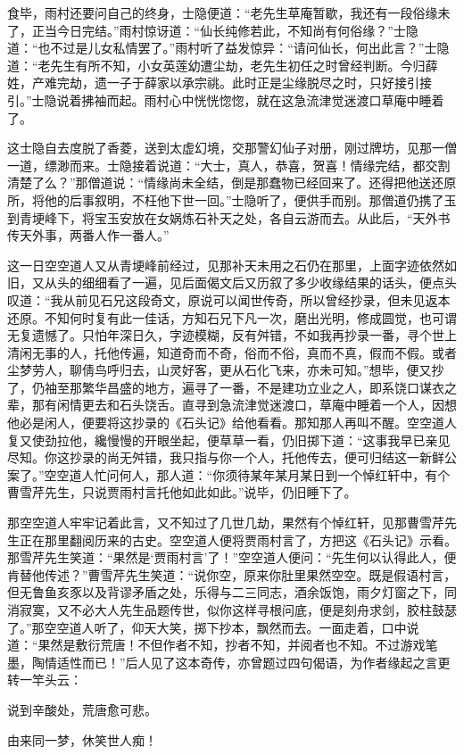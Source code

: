 \begin{parag}
    食毕，雨村还要问自己的终身，士隐便道：“老先生草庵暂歇，我还有一段俗缘未了，正当今日完结。”雨村惊讶道：“仙长纯修若此，不知尚有何俗缘？”士隐道：“也不过是儿女私情罢了。”雨村听了益发惊异：“请问仙长，何出此言？”士隐道：“老先生有所不知，小女英莲幼遭尘劫，老先生初任之时曾经判断。今归薛姓，产难完劫，遗一子于薛家以承宗祧。此时正是尘缘脱尽之时，只好接引接引。”士隐说着拂袖而起。雨村心中恍恍惚惚，就在这急流津觉迷渡口草庵中睡着了。
\end{parag}


\begin{parag}
    这士隐自去度脱了香菱，送到太虚幻境，交那警幻仙子对册，刚过牌坊，见那一僧一道，缥渺而来。士隐接着说道：“大士，真人，恭喜，贺喜！情缘完结，都交割清楚了么？”那僧道说：“情缘尚未全结，倒是那蠢物已经回来了。还得把他送还原所，将他的后事叙明，不枉他下世一回。”士隐听了，便供手而别。那僧道仍携了玉到青埂峰下，将宝玉安放在女娲炼石补天之处，各自云游而去。从此后，“天外书传天外事，两番人作一番人。”
\end{parag}


\begin{parag}
    这一日空空道人又从青埂峰前经过，见那补天未用之石仍在那里，上面字迹依然如旧，又从头的细细看了一遍，见后面偈文后又历叙了多少收缘结果的话头，便点头叹道：“我从前见石兄这段奇文，原说可以闻世传奇，所以曾经抄录，但未见返本还原。不知何时复有此一佳话，方知石兄下凡一次，磨出光明，修成圆觉，也可谓无复遗憾了。只怕年深日久，字迹模糊，反有舛错，不如我再抄录一番，寻个世上清闲无事的人，托他传遍，知道奇而不奇，俗而不俗，真而不真，假而不假。或者尘梦劳人，聊倩鸟呼归去，山灵好客，更从石化飞来，亦未可知。”想毕，便又抄了，仍袖至那繁华昌盛的地方，遍寻了一番，不是建功立业之人，即系饶口谋衣之辈，那有闲情更去和石头饶舌。直寻到急流津觉迷渡口，草庵中睡着一个人，因想他必是闲人，便要将这抄录的《石头记》给他看看。那知那人再叫不醒。空空道人复又使劲拉他，纔慢慢的开眼坐起，便草草一看，仍旧掷下道：“这事我早已亲见尽知。你这抄录的尚无舛错，我只指与你一个人，托他传去，便可归结这一新鲜公案了。”空空道人忙问何人，那人道：“你须待某年某月某日到一个悼红轩中，有个曹雪芹先生，只说贾雨村言托他如此如此。”说毕，仍旧睡下了。
\end{parag}


\begin{parag}
    那空空道人牢牢记着此言，又不知过了几世几劫，果然有个悼红轩，见那曹雪芹先生正在那里翻阅历来的古史。空空道人便将贾雨村言了，方把这《石头记》示看。那雪芹先生笑道：“果然是‘贾雨村言’了！”空空道人便问：“先生何以认得此人，便肯替他传述？”曹雪芹先生笑道：“说你空，原来你肚里果然空空。既是假语村言，但无鲁鱼亥豕以及背谬矛盾之处，乐得与二三同志，酒余饭饱，雨夕灯窗之下，同消寂寞，又不必大人先生品题传世，似你这样寻根问底，便是刻舟求剑，胶柱鼓瑟了。”那空空道人听了，仰天大笑，掷下抄本，飘然而去。一面走着，口中说道：“果然是敷衍荒唐！不但作者不知，抄者不知，并阅者也不知。不过游戏笔墨，陶情适性而已！”后人见了这本奇传，亦曾题过四句偈语，为作者缘起之言更转一竿头云：
\end{parag}


\begin{poem}
    \begin{pl}
        说到辛酸处，荒唐愈可悲。
    \end{pl}

    \begin{pl}
        由来同一梦，休笑世人痴！
    \end{pl}
\end{poem}